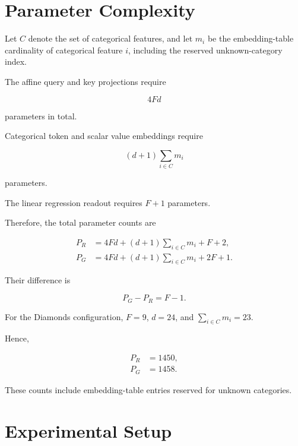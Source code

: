 \documentclass[11pt,a4paper]{article}
\begin{document}
\section{Parameter Complexity}

Let $C$ denote the set of categorical
features, and let $m_i$ be the
embedding-table cardinality of categorical
feature $i$, including the reserved
unknown-category index.

The affine query and key projections require

\begin{equation}
4Fd
\end{equation}

parameters in total.

Categorical token and scalar value
embeddings require

\begin{equation}
(d+1)\sum_{i\in C}m_i
\end{equation}

parameters.

The linear regression readout requires
$F+1$ parameters.

Therefore, the total parameter counts are

\begin{align}
P_R
&=
4Fd
+
(d+1)\sum_{i\in C}m_i
+
F+2,
\\
P_G
&=
4Fd
+
(d+1)\sum_{i\in C}m_i
+
2F+1.
\end{align}

Their difference is

\begin{equation}
\boxed{P_G-P_R=F-1.}
\end{equation}

For the Diamonds configuration,
$F=9$, $d=24$, and
$\sum_{i\in C}m_i=23$.

Hence,

\begin{align}
P_R&=1450,\\
P_G&=1458.
\end{align}

These counts include embedding-table
entries reserved for unknown categories.

\section{Experimental Setup}
\end{document}
